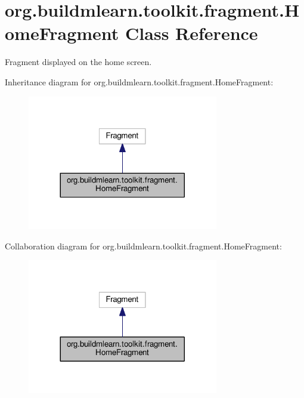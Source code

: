 \hypertarget{classorg_1_1buildmlearn_1_1toolkit_1_1fragment_1_1HomeFragment}{}\section{org.\+buildmlearn.\+toolkit.\+fragment.\+Home\+Fragment Class Reference}
\label{classorg_1_1buildmlearn_1_1toolkit_1_1fragment_1_1HomeFragment}


Fragment displayed on the home screen.  




Inheritance diagram for org.\+buildmlearn.\+toolkit.\+fragment.\+Home\+Fragment\+:
\nopagebreak
\begin{figure}[H]
\begin{center}
\leavevmode
\includegraphics[width=236pt]{classorg_1_1buildmlearn_1_1toolkit_1_1fragment_1_1HomeFragment__inherit__graph}
\end{center}
\end{figure}


Collaboration diagram for org.\+buildmlearn.\+toolkit.\+fragment.\+Home\+Fragment\+:
\nopagebreak
\begin{figure}[H]
\begin{center}
\leavevmode
\includegraphics[width=236pt]{classorg_1_1buildmlearn_1_1toolkit_1_1fragment_1_1HomeFragment__coll__graph}
\end{center}
\end{figure}
